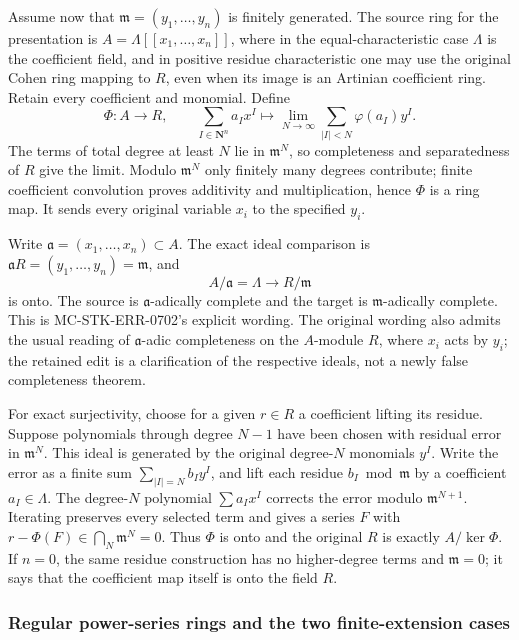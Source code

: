 Assume now that \(\mathfrak m=(y_1,\ldots,y_n)\) is finitely generated. The source ring for the presentation is \(A=\Lambda[[x_1,\ldots,x_n]]\), where in the equal-characteristic case \(\Lambda\) is the coefficient field, and in positive residue characteristic one may use the original Cohen ring mapping to \(R\), even when its image is an Artinian coefficient ring. Retain every coefficient and monomial. Define \[
 \Phi:A\longrightarrow R,\qquad
 \sum_{I\in\mathbf N^n}a_Ix^I
 \longmapsto
 \lim_{N\to\infty}\sum_{|I|<N}\varphi(a_I)y^I.
\] The terms of total degree at least \(N\) lie in \(\mathfrak m^N\), so completeness and separatedness of \(R\) give the limit. Modulo \(\mathfrak m^N\) only finitely many degrees contribute; finite coefficient convolution proves additivity and multiplication, hence \(\Phi\) is a ring map. It sends every original variable \(x_i\) to the specified \(y_i\).

Write \(\mathfrak a=(x_1,\ldots,x_n)\subset A\). The exact ideal comparison is \(\mathfrak aR=(y_1,\ldots,y_n)=\mathfrak m\), and \[
 A/\mathfrak a=\Lambda\longrightarrow R/\mathfrak m
\] is onto. The source is \(\mathfrak a\)-adically complete and the target is \(\mathfrak m\)-adically complete. This is MC-\AlgebraIdentifierBreak{}STK-\AlgebraIdentifierBreak{}ERR-\AlgebraIdentifierBreak{}0702's explicit wording. The original wording also admits the usual reading of \(\mathfrak a\)-adic completeness on the \(A\)-module \(R\), where \(x_i\) acts by \(y_i\); the retained edit is a clarification of the respective ideals, not a newly false completeness theorem.

For exact surjectivity, choose for a given \(r\in R\) a coefficient lifting its residue. Suppose polynomials through degree \(N-1\) have been chosen with residual error in \(\mathfrak m^N\). This ideal is generated by the original degree-\(N\) monomials \(y^I\). Write the error as a finite sum \(\sum_{|I|=N}b_Iy^I\), and lift each residue \(b_I\bmod\mathfrak m\) by a coefficient \(a_I\in\Lambda\). The degree-\(N\) polynomial \(\sum a_Ix^I\) corrects the error modulo \(\mathfrak m^{N+1}\). Iterating preserves every selected term and gives a series \(F\) with \(r-\Phi(F)\in\bigcap_N\mathfrak m^N=0\). Thus \(\Phi\) is onto and the original \(R\) is exactly \(A/\ker\Phi\). If \(n=0\), the same residue construction has no higher-degree terms and \(\mathfrak m=0\); it says that the coefficient map itself is onto the field \(R\).

\subsubsection{Regular power-series rings and the two finite-extension cases}\label{algebra-proof-065-regular-power-series-rings-and-the-two-finite-extension-cases}

